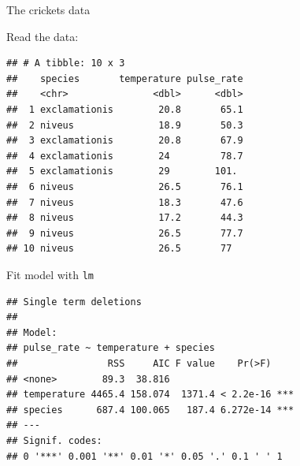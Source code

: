 \documentclass[ignorenonframetext,]{beamer}
\newenvironment{Shaded}{\begin{snugshade}}{\end{snugshade}}
\newcommand{\DataTypeTok}[1]{\textcolor[rgb]{0.13,0.29,0.53}{#1}}
\newcommand{\DecValTok}[1]{\textcolor[rgb]{0.00,0.00,0.81}{#1}}
\newcommand{\FloatTok}[1]{\textcolor[rgb]{0.00,0.00,0.81}{#1}}
\newcommand{\KeywordTok}[1]{\textcolor[rgb]{0.13,0.29,0.53}{\textbf{#1}}}
\newcommand{\NormalTok}[1]{#1}
\newcommand{\OperatorTok}[1]{\textcolor[rgb]{0.81,0.36,0.00}{\textbf{#1}}}
\newcommand{\StringTok}[1]{\textcolor[rgb]{0.31,0.60,0.02}{#1}}
\begin{document}
\begin{frame}[fragile]{The crickets data}
\protect\hypertarget{the-crickets-data}{}

Read the data:

\small

\begin{Shaded}
\end{Shaded}

\begin{verbatim}
## # A tibble: 10 x 3
##    species       temperature pulse_rate
##    <chr>               <dbl>      <dbl>
##  1 exclamationis        20.8       65.1
##  2 niveus               18.9       50.3
##  3 exclamationis        20.8       67.9
##  4 exclamationis        24         78.7
##  5 exclamationis        29        101. 
##  6 niveus               26.5       76.1
##  7 niveus               18.3       47.6
##  8 niveus               17.2       44.3
##  9 niveus               26.5       77.7
## 10 niveus               26.5       77
\end{verbatim}

\normalsize

\end{frame}

\begin{frame}[fragile]{Fit model with \texttt{lm}}
\protect\hypertarget{fit-model-with-lm}{}

\begin{Shaded}
\end{Shaded}

\begin{verbatim}
## Single term deletions
## 
## Model:
## pulse_rate ~ temperature + species
##                RSS     AIC F value    Pr(>F)    
## <none>        89.3  38.816                      
## temperature 4465.4 158.074  1371.4 < 2.2e-16 ***
## species      687.4 100.065   187.4 6.272e-14 ***
## ---
## Signif. codes:  
## 0 '***' 0.001 '**' 0.01 '*' 0.05 '.' 0.1 ' ' 1
\end{verbatim}

\end{frame}
\end{document}
